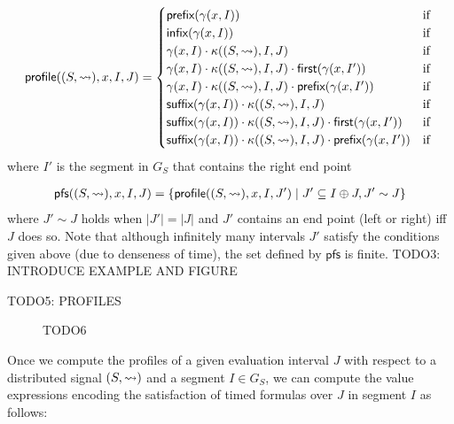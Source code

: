 \small
\begin{multline*}
	\mathsf{profile}((S,{\rightsquigarrow}), x, I, J) =
	\begin{cases}
		\textsf{prefix}(\gamma(x,I)) & \text{if } \\
		\textsf{infix}(\gamma(x,I)) & \text{if } \\
		\gamma(x,I) \cdot \kappa((S,{\rightsquigarrow}), I, J) & \text{if } \\
		\gamma(x,I) \cdot \kappa((S,{\rightsquigarrow}), I, J) \cdot \textsf{first}(\gamma(x,I')) & \text{if } \\		
		\gamma(x,I) \cdot \kappa((S,{\rightsquigarrow}), I, J) \cdot \textsf{prefix}(\gamma(x,I')) & \text{if } \\
		\textsf{suffix}(\gamma(x,I)) \cdot \kappa((S,{\rightsquigarrow}), I, J) & \text{if } \\
		\textsf{suffix}(\gamma(x,I)) \cdot \kappa((S,{\rightsquigarrow}), I, J) \cdot \textsf{first}(\gamma(x,I')) & \text{if } \\
		\textsf{suffix}(\gamma(x,I)) \cdot \kappa((S,{\rightsquigarrow}), I, J) \cdot \textsf{prefix}(\gamma(x,I')) & \text{if } \\
	\end{cases}
\end{multline*}
\normalsize
where
$I'$ is the segment in $G_S$ that contains the right end point 

\small
\begin{align*}
	\mathsf{pfs}((S,{\hb}), x, I, J) = \{\mathsf{profile}((S,{\hb}), x, I, J') \st J' \subseteq I \oplus J, J' \sim J\}
\end{align*}
\normalsize
where $J' \sim J$ holds when $|J'| = |J|$ and $J'$ contains an end point (left or right) iff $J$ does so.
Note that although infinitely many intervals $J'$ satisfy the conditions given above (due to denseness of time), the set defined by $\mathsf{pfs}$ is finite.
\alert{TODO3: INTRODUCE EXAMPLE AND FIGURE}

\begin{example}
	\alert{TODO5: PROFILES}
\end{example}

\begin{figure} 
	\centering
	\caption{\alert{TODO6}}
	\label{fig:profiles}
\end{figure}


Once we compute the profiles of a given evaluation interval $J$ with respect to a distributed signal $(S,{\rightsquigarrow})$ and a segment $I \in G_S$, we can compute the value expressions encoding the satisfaction of timed formulas over $J$ in segment $I$ as follows:

